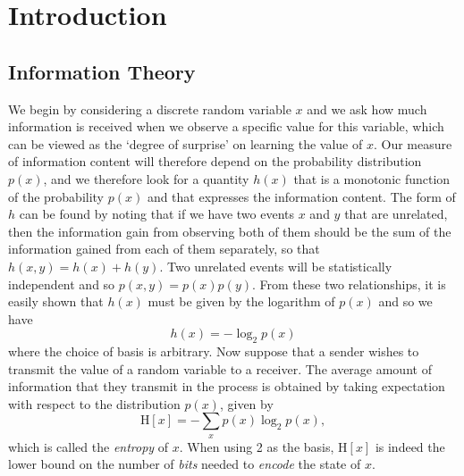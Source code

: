 \chapter{Introduction}

\setcounter{section}{5}

\section{Information Theory}

We begin by considering a discrete random variable $x$ and we ask how much information is received when we observe a specific value for this variable, which can be viewed as the `degree of surprise' on learning the value of $x$. Our measure of information content will therefore depend on the probability distribution $p(x)$, and we therefore look for a quantity $h(x)$ that is a monotonic function of the probability $p(x)$ and that expresses the information content. The form of $h$ can be found by noting that if we have two events $x$ and $y$ that are unrelated, then the information gain from observing both of them should be the sum of the information gained from each of them separately, so that $h(x,y) = h(x) + h(y)$. Two unrelated events will be statistically independent and so $p(x, y) = p(x)p(y)$. From these two relationships, it is easily shown that $h(x)$ must be given by the logarithm of $p(x)$ and so we have
\[
  h(x)=-\log_2p(x)
\]
where the choice of basis is arbitrary. Now suppose that a sender wishes to transmit the value of a random variable to a receiver. The average amount of information that they transmit in the process is
obtained by taking expectation with respect to the distribution $p(x)$, given by
\[
  \mathrm{H}[x]=-\sum_xp(x)\log_2p(x),
\]
which is called the \textit{entropy} of $x$. When using 2 as the basis, $\mathrm{H}[x]$ is indeed the lower bound on the number of \textit{bits} needed to \textit{encode} the state of $x$.

